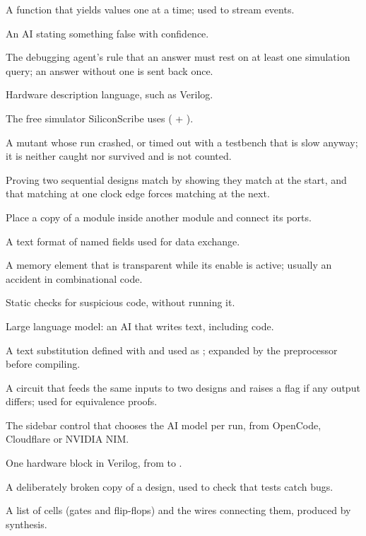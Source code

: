 \begin{description}[style=nextline,itemsep=1pt]
  \item[Generator (Python)] A function that yields values one at a time; used to stream events.
  \item[Hallucination] An AI stating something false with confidence.
  \item[Grounding rule] The debugging agent's rule that an answer must rest on at least one simulation query; an answer without one is sent back once.
  \item[HDL] Hardware description language, such as Verilog.
  \item[Icarus Verilog] The free simulator SiliconScribe uses ( + ).
  \item[Inconclusive (mutant)] A mutant whose run crashed, or timed out with a testbench that is slow anyway; it is neither caught nor survived and is not counted.
  \item[Induction (temporal)] Proving two sequential designs match by showing they match at the start, and that matching at one clock edge forces matching at the next.
  \item[Instantiate] Place a copy of a module inside another module and connect its ports.
  \item[JSON] A text format of named fields used for data exchange.
  \item[Latch] A memory element that is transparent while its enable is active; usually an accident in combinational code.
  \item[Lint] Static checks for suspicious code, without running it.
  \item[LLM] Large language model: an AI that writes text, including code.
  \item[Macro (Verilog)] A text substitution defined with  and used as ; expanded by the preprocessor before compiling.
  \item[Miter] A circuit that feeds the same inputs to two designs and raises a flag if any output differs; used for equivalence proofs.
  \item[Model menu] The sidebar control that chooses the AI model per run, from OpenCode, Cloudflare or NVIDIA NIM.
  \item[Module] One hardware block in Verilog, from  to .
  \item[Mutant / mutation testing] A deliberately broken copy of a design, used to check that tests catch bugs.
  \item[Netlist] A list of cells (gates and flip-flops) and the wires connecting them, produced by synthesis.

\end{description}
